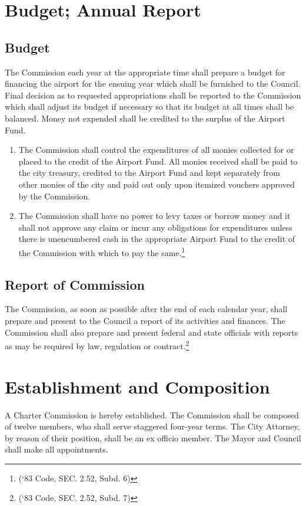 \section{Budget; Annual Report}
\subsection{Budget}
The Commission each year at the appropriate time shall prepare a budget for financing the airport for the ensuing year which shall be furnished to the Council.  Final decision as to requested appropriations shall be reported to the Commission which shall adjust its budget if necessary so that its budget at all times shall be balanced.  Money not expended shall be credited to the surplus of the Airport Fund.
\begin{enumerate}
    \item The Commission shall control the expenditures of all monies collected for or placed to the credit of the Airport Fund.  All monies received shall be paid to the city treasury, credited to the Airport Fund and kept separately from other monies of the city and paid out only upon itemized vouchers approved by the Commission.
    \item The Commission shall have no power to levy taxes or borrow money and it shall not approve any claim or incur any obligations for expenditures unless there is unencumbered cash in the appropriate Airport Fund to the credit of the Commission with which to pay the same.\footnote{(‘83 Code, SEC. 2.52, Subd. 6)}
\end{enumerate}
\subsection{Report of Commission}
The Commission, as soon as possible after the end of each calendar year, shall prepare and present to the Council a report of its activities and finances.  The Commission shall also prepare and present federal and state officials with reports as may be required by law, regulation or contract.\footnote{(‘83 Code, SEC. 2.52, Subd. 7)}\\

\setcounter{section}{109}
\section{Establishment and Composition}
A Charter Commission is hereby established. The Commission shall be composed of twelve members, who shall serve staggered four-year terms.  The City Attorney, by reason of their position, shall be an ex officio member. The Mayor and Council shall make all appointments.

